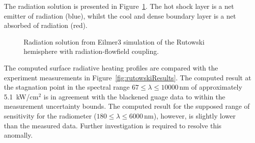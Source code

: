 The radiation solution is presented in Figure~\ref{fig:rutowskiRadiation}.
The hot shock layer is a net emitter of radiation (blue), whilst the cool and dense boundary layer is a net absorbed of radiation (red).

\begin{figure}
 \centering
 \caption{Radiation solution from Eilmer3 simulation of the Rutowski hemisphere with radiation-flowfield coupling.}
  \label{fig:rutowskiRadiation}
\end{figure}

The computed surface radiative heating profiles are compared with the experiment measurements in Figure~\ref{fig:rutowskiResults}.
The computed result at the stagnation point in the spectral range $67 \leq \lambda \leq 10000$\,nm of approximately 5.1~kW/cm$^2$ is in agreement with the blackened guage data to within the measurement uncertainty bounds.
The computed result for the supposed range of sensitivity for the radiometer ($180 \leq \lambda \leq 6000$\,nm), however, is slightly lower than the measured data.
Further investigation is required to resolve this anomally.  

